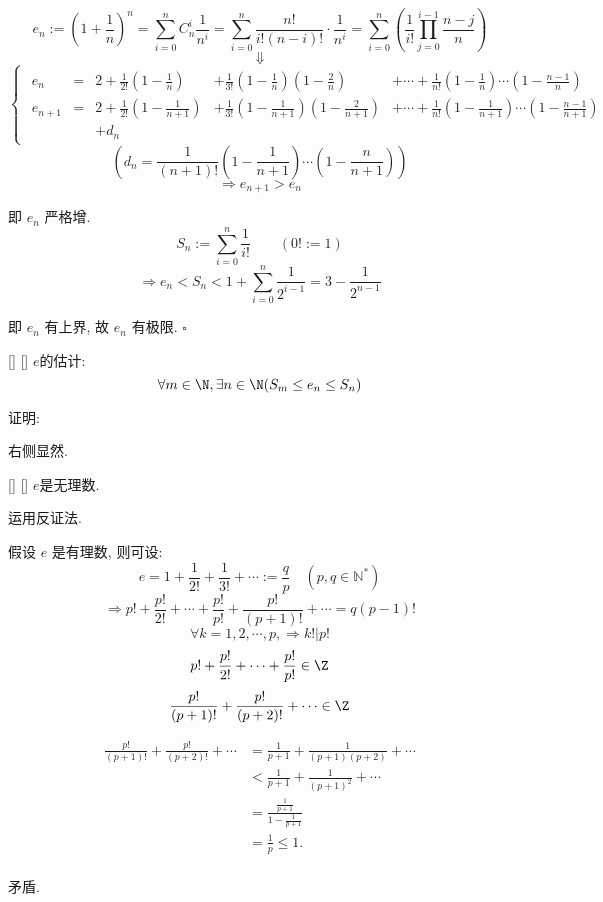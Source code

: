 \documentclass[UTF8]{ctexart}
\begin{document}
				\[e_n:=\left(1+\frac{1}{n}\right)^n=\sum_{i=0}^n C_n^i\frac{1}{n^i}=\sum_{i=0}^n\frac{n!}{i!(n-i)!}\cdot\frac{1}{n^i}=\sum_{i=0}^n\left(\frac{1}{i!}\prod_{j=0}^{i-1}\frac{n-j}{n}\right)\]
				\[\Downarrow\]
				\[\begin{cases}
					\begin{array}{rcllllll}
						e_n & = & 2 + \frac{1}{2!}\left(1-\frac{1}{n}\right) & + \frac{1}{3!}\left(1-\frac{1}{n}\right)\left(1-\frac{2}{n}\right) & +\cdots+ \frac{1}{n!}\left(1-\frac{1}{n}\right)\cdots\left(1-\frac{n-1}{n}\right)\\
						e_{n+1} & = & 2 + \frac{1}{2!}\left(1-\frac{1}{n+1}\right) & + \frac{1}{3!}\left(1-\frac{1}{n+1}\right)\left(1-\frac{2}{n+1}\right) & +\cdots+ \frac{1}{n!}\left(1-\frac{1}{n+1}\right)\cdots\left(1-\frac{n-1}{n+1}\right)\\
						& & + d_n
					\end{array}
				\end{cases}\]	
				\[\left(d_n=\frac{1}{(n+1)!}\left(1-\frac{1}{n+1}\right)\cdots\left(1-\frac{n}{n+1}\right)\right)\]
				\[\Longrightarrow e_{n+1}>e_n\]
				
				即 \(e_n\) 严格增. 
				\[S_n:=\sum_{i=0}^n\frac{1}{i!}\qquad(0!:=1)\]
				\[\Longrightarrow e_n<S_n<1+\sum_{i=0}^n\frac{1}{2^{i-1}}=3-\frac{1}{2^{n-1}}\]

				即 \(e_n\) 有上界, 故 \(e_n\) 有极限. \(\square\)

                \fi
			
			\begin{thm}
			    []
			    {}
			    []
			    []
				\(e\)的估计: 
				\[\forall m\in\N, \exists n\in\N(S_m\leq e_n\leq S_n)\]
			\end{thm}

			证明: 

				右侧显然. 
			
			\begin{thm}
			    []
			    {}
			    []
			    []
				\(e\)是无理数. 
			\end{thm}

			\begin{prf}
				运用反证法. 
				
				假设 \(e\) 是有理数, 则可设: 
				\[e=1+\frac{1}{2!}+\frac{1}{3!}+\cdots:=\frac{q}{p}\quad(p,q\in\mathbb{N}^*)\]
				\[\Longrightarrow p!+\frac{p!}{2!}+\cdots+\frac{p!}{p!}+\frac{p!}{(p+1)!}+\cdots=q(p-1)!\]
				\[\forall k=1,2,\cdots,p,\Longrightarrow k!|p!\]
				\[p!+\frac{p!}{2!}+\cdots+\frac{p!}{p!}\in\Z\]
				\[\frac{p!}{(p+1)!}+\frac{p!}{(p+2)!}+\cdots\in\Z\]

				\[\begin{aligned}
				\frac{p!}{(p+1)!}+\frac{p!}{(p+2)!}+\cdots & =\frac1{p+1}+\frac1{(p+1)(p+2)}+\cdots \\
				&<\frac1{p+1}+\frac1{(p+1)^2}+\cdots \\
				&=\frac{\frac{1}{p+1}}{1-\frac{1}{p+1}} \\
				&=\frac1p\leq1. \\
				\end{aligned}\]

				矛盾.
			\end{prf} 
\end{document}

